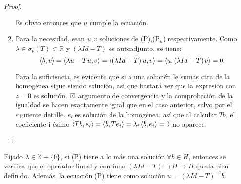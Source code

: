\begin{proof}
\begin{enumerate}
      Es obvio entonces que $u$ cumple la ecuación.

    \item Para la necesidad, sean $u,v$ soluciones de (P),(P$_h$)
      respectivamente. Como $\lambda\in \sigma_p(T)\subset \mathbb{R}$ y
      $(\lambda Id-T)$ es autoadjunto, se tiene:
      \[
      \left\langle b,v\right\rangle=
      \left\langle\lambda u - Tu,v\right\rangle=
      \left\langle\left( \lambda Id - T \right) u,v\right\rangle=
      \left\langle u,\left( \lambda Id - T \right) v\right\rangle=
      0
      .\] 

      Para la suficiencia, es evidente que si a una solución le sumas otra de la
      homogénea sigue siendo solución, así que bastará ver que la expresión con
      $z=0$ es solución. El argumento de convergencia y la comprobación de la
      igualdad se hacen exactamente igual que en el caso anterior, salvo por el
      siguiente detalle. $e_i$ es solución de la homogénea, así que al calcular
      $Tb$, el coeficiente i-ésimo
      $\left\langle Tb,e_i\right\rangle=\left\langle b,Te_i\right\rangle=\lambda_i\left\langle b,e_i\right\rangle=0$ no aparece.
  \end{enumerate}
\end{proof}

\begin{corollary}
  Fijado $\lambda\in \mathbb{K}-\{0\}$, si (P) tiene a lo más una solución
  $\forall  b\in H$, entonces se verifica que el operador lineal y continuo
  $(\lambda Id-T)^{-1}:H\to H$ queda bien definido. Además, la ecuación (P)
  tiene como solución $u=(\lambda Id-T)^{-1} b$.
\end{corollary}

